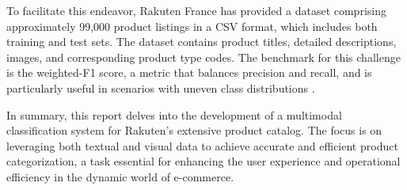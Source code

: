 To facilitate this endeavor, Rakuten France has provided a dataset comprising approximately 99,000 product listings in a CSV format, which includes both training and test sets. The dataset contains product titles, detailed descriptions, images, and corresponding product type codes. The benchmark for this challenge is the weighted-F1 score, a metric that balances precision and recall, and is particularly useful in scenarios with uneven class distributions \cite{10.1093/mnrasl/slac120}.

In summary, this report delves into the development of a multimodal classification system for Rakuten's extensive product catalog. The focus is on leveraging both textual and visual data to achieve accurate and efficient product categorization, a task essential for enhancing the user experience and operational efficiency in the dynamic world of e-commerce.





